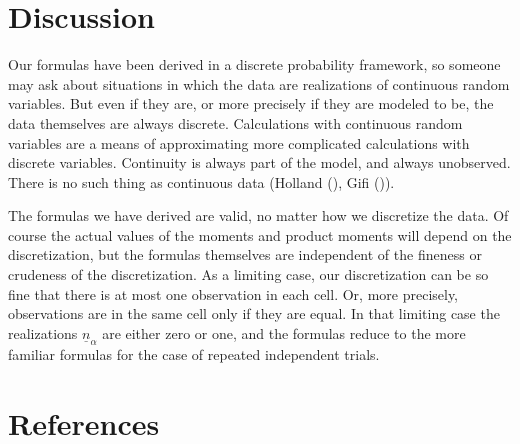 \documentclass[
  12pt,
  letterpaper,
  DIV=11,
  numbers=noendperiod]{scrartcl}
\newcommand{\sectionbreak}{\clearpage}
\newcommand{\ul}[1]{\underline{#1}}
\begin{document}
\sectionbreak

\section{Discussion}\label{discussion}

Our formulas have been derived in a discrete probability framework, so
someone may ask about situations in which the data are realizations of
continuous random variables. But even if they are, or more precisely if
they are modeled to be, the data themselves are always discrete.
Calculations with continuous random variables are a means of
approximating more complicated calculations with discrete variables.
Continuity is always part of the model, and always unobserved. There is
no such thing as continuous data (Holland
(), Gifi
()).

The formulas we have derived are valid, no matter how we discretize the
data. Of course the actual values of the moments and product moments
will depend on the discretization, but the formulas themselves are
independent of the fineness or crudeness of the discretization. As a
limiting case, our discretization can be so fine that there is at most
one observation in each cell. Or, more precisely, observations are in
the same cell only if they are equal. In that limiting case the
realizations \(\ul{n}_\alpha\) are either zero or one, and the formulas
reduce to the more familiar formulas for the case of repeated
independent trials.

\sectionbreak

\section*{References}\label{references}
\end{document}
